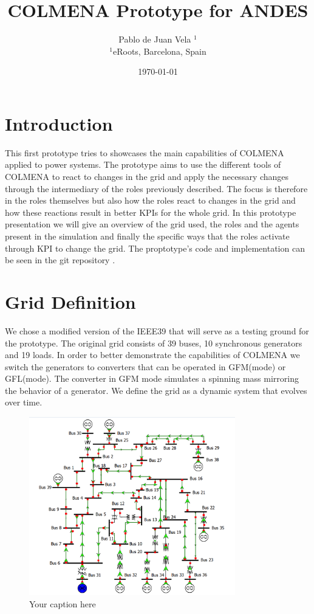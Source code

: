 \documentclass{article}
\title{COLMENA Prototype for ANDES}
\author{Pablo de Juan Vela $^{1}$ \\
        \small $^{1}$eRoots, Barcelona, Spain \\
}
\date{\today}
\begin{document}
\maketitle

\section{Introduction}

This first prototype tries to showcases the main capabilities of COLMENA applied to power systems. The prototype aims to use the different tools of COLMENA to react to changes in the grid and apply the necessary changes through the intermediary of the roles previously described. The focus is therefore in the roles themselves but also how the roles react to changes in the grid and how these reactions result in better KPIs for the whole grid. In this prototype presentation we will give an overview of the grid used, the roles and the agents present in the simulation and finally the specific ways that the roles activate through KPI to change the grid. The proptotype's code and implementation can be seen in the git repository \cite{git:eroots}.     

\section{Grid Definition}

We chose a modified version of the IEEE39 \cite{grids:ieee39} that will serve as a testing ground for the prototype. The original grid consists of 39 buses, 10 synchronous generators and 19 loads. In order to better demonstrate the capabilities of COLMENA we switch the generators to converters that can  be operated in GFM(mode) or GFL(mode). The converter in GFM mode simulates a spinning mass mirroring the behavior of a generator. We define the grid as a dynamic system that evolves over time.
\begin{figure}[h]
    \centering
    \begin{center}
        \includegraphics[width=0.8\textwidth]{plots/IEEE39 (1).png}
    \end{center}
    \caption{Your caption here}
    \label{fig:your_label}
\end{figure}
\end{document}
